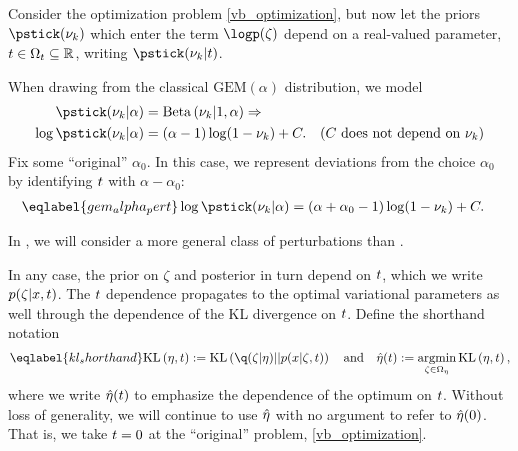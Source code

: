 Consider the optimization problem \eqref{vb_optimization}, but now let the
priors $\pstick(\nuk)$ which enter the term $\logp(\zeta)$ depend on a
real-valued parameter, $t \in \Omega_{t} \subseteq \mathbb{R}$, writing
$\pstick(\nuk \vert \t)$.

\begin{ex}
%
When drawing from the classical $\mathrm{GEM}(\alpha)$ distribution, we
model
%
\begin{align*}
%
\pstick(\nuk \vert \alpha) ={}&
    \betadist{\nuk \vert 1, \alpha} \Rightarrow\\
\log \pstick(\nuk \vert \alpha) ={}&
    (\alpha - 1) \log(1 - \nuk) + \const. &
    \constdesc{\nuk}
%
\end{align*}
%
Fix some ``original'' $\alpha_0$.  In this case, we represent deviations from the
choice $\alpha_0$ by identifying $t$ with $\alpha - \alpha_0$:
%
\begin{align}\eqlabel{gem_alpha_pert}
%
\log \pstick(\nuk \vert \alpha) ={}&
    (\alpha + \alpha_0 - 1) \log(1 - \nuk) + \const.
%
\end{align}
%
\end{ex}

In , we will consider a more general class of
perturbations than .

In any case, the prior on $\zeta$ and posterior in turn depend on $t$, which we
write $p(\zeta \vert x, t)$. The $t$ dependence propagates to the optimal
variational parameters as well through the dependence of the KL divergence on
$t$.  Define the shorthand notation
%
\begin{align}\eqlabel{kl_shorthand}
%
\KL{\eta, \t} := \KL{\q(\zeta \vert \eta) || p(\x \vert \zeta, \t)}
\mathand
\etaopt(\t) := \argmin_{\zeta \in \etadom} \KL{\eta, \t},
%
\end{align}
%
where we write $\hat\eta(t)$ to emphasize the dependence of the optimum on $t$.
Without loss of generality, we will continue to use $\hat\eta$ with no argument
to refer to $\hat\eta(0)$.  That is, we take $t = 0$ at the ``original''
problem, \eqref{vb_optimization}.

